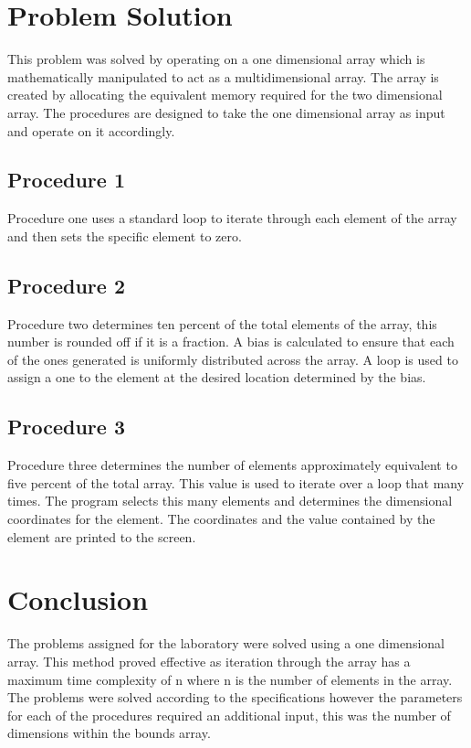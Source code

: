 \documentclass{TechReport}
\begin{document}
\section{Problem Solution}
This problem was solved by operating on a one dimensional array which is mathematically manipulated to act as a multidimensional array.  The array is created by allocating the equivalent memory required for the two dimensional array. The procedures are designed to take the one dimensional array as input and operate on it accordingly. 

\subsection{Procedure 1}
Procedure one uses a standard loop to iterate through each element of the array and then sets the specific element to zero.

\subsection{Procedure 2}
Procedure two determines ten percent of the total elements of the array, this number is rounded off if it is a fraction. A bias is calculated to ensure that each of the ones generated is uniformly distributed across the array. A loop is used to assign a one to the element at the desired location determined by the bias.

\subsection{Procedure 3}
Procedure three determines the number of elements approximately equivalent to five percent of the total array. This value is used to iterate over a loop that many times. The program selects this many elements and determines the dimensional coordinates for the element. The coordinates and the value contained by the element are printed to the screen.


\section{Conclusion}
The problems assigned for the laboratory were solved using a one dimensional array. This method proved effective as iteration through the array has a maximum time complexity of n where n is the number of elements in the array. The problems were solved according to the specifications however the parameters for each of the procedures required an additional input, this was the number of dimensions within the bounds array.  
\end{document}
